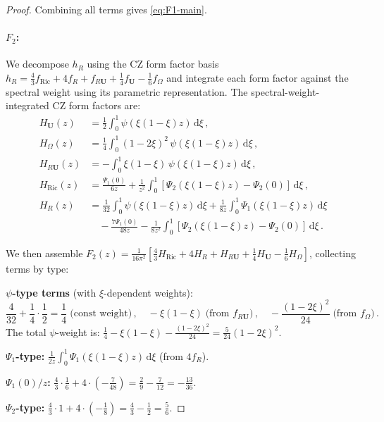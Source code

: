 \documentclass[11pt,a4paper]{article}
\renewcommand{\dd}{\mathrm{d}}
\theoremstyle{definition}
\theoremstyle{remark}
\begin{document}
\begin{proof}
Combining all terms gives \eqref{eq:F1-main}.

\paragraph{$F_2$:}
We decompose $h_R$ using the CZ form factor basis
$h_R = \frac{4}{3}f_{\text{Ric}} + 4f_R + f_{R\mathbf{U}}
+ \frac{1}{4}f_{\mathbf{U}} - \frac{1}{6}f_\Omega$
and integrate each form factor against the spectral weight using
its parametric representation.  The spectral-weight-integrated
CZ form factors are:
\begin{align*}
  H_{\mathbf{U}}(z) &= \frac{1}{2}\int_0^1\psi(\xi(1-\xi)z)\,\dd\xi\,,\\
  H_\Omega(z) &= \frac{1}{4}\int_0^1(1-2\xi)^2\,\psi(\xi(1-\xi)z)\,\dd\xi\,,\\
  H_{R\mathbf{U}}(z) &= -\int_0^1\xi(1-\xi)\,\psi(\xi(1-\xi)z)\,\dd\xi\,,\\
  H_{\text{Ric}}(z) &= \frac{\Psi_1(0)}{6z}
  + \frac{1}{z^2}\int_0^1[\Psi_2(\xi(1-\xi)z)-\Psi_2(0)]\,\dd\xi\,,\\
  H_R(z) &= \frac{1}{32}\int_0^1\psi(\xi(1-\xi)z)\,\dd\xi
  + \frac{1}{8z}\int_0^1\Psi_1(\xi(1-\xi)z)\,\dd\xi\\
  &\quad - \frac{7\Psi_1(0)}{48z}
  - \frac{1}{8z^2}\int_0^1[\Psi_2(\xi(1-\xi)z)-\Psi_2(0)]\,\dd\xi\,.
\end{align*}

We then assemble
$F_2(z) = \frac{1}{16\pi^2}[\frac{4}{3}H_{\text{Ric}} + 4H_R
+ H_{R\mathbf{U}} + \frac{1}{4}H_{\mathbf{U}} - \frac{1}{6}H_\Omega]$,
collecting terms by type:

\medskip\noindent
\textbf{$\psi$-type terms} (with $\xi$-dependent weights):
\begin{equation*}
  \frac{4}{32} + \frac{1}{4}\cdot\frac{1}{2} = \frac{1}{4}
  \;\text{(const weight)}\,,\quad
  -\xi(1-\xi)\;\text{(from $f_{R\mathbf{U}}$)}\,,\quad
  -\frac{(1-2\xi)^2}{24}\;\text{(from $f_\Omega$)}\,.
\end{equation*}
The total $\psi$-weight is:
$\frac{1}{4} - \xi(1-\xi) - \frac{(1-2\xi)^2}{24}
= \frac{5}{24}(1-2\xi)^2$.

\medskip\noindent
\textbf{$\Psi_1$-type:}
$\frac{1}{2z}\int_0^1\Psi_1(\xi(1-\xi)z)\,\dd\xi$ (from $4f_R$).

\medskip\noindent
\textbf{$\Psi_1(0)/z$:}
$\frac{4}{3}\cdot\frac{1}{6} + 4\cdot(-\frac{7}{48})
= \frac{2}{9} - \frac{7}{12} = -\frac{13}{36}$.

\medskip\noindent
\textbf{$\Psi_2$-type:}
$\frac{4}{3}\cdot 1 + 4\cdot(-\frac{1}{8})
= \frac{4}{3} - \frac{1}{2} = \frac{5}{6}$.


\end{proof}
\end{document}
